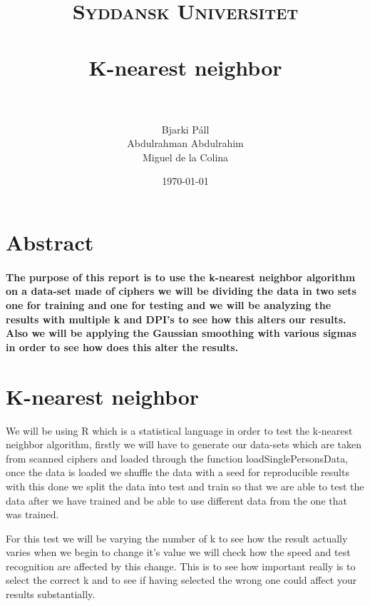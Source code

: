 \documentclass[paper=a4, fontsize=11pt]{scrartcl} %
\title{	
\normalfont \normalsize 
\textsc{Syddansk Universitet} \\ [25pt] 
\horrule{0.5pt} \\[0.4cm] %
\huge K-nearest neighbor \\ %
\horrule{2pt} \\[0.5cm] %
}
\author{Bjarki Páll \\ Abdulrahman Abdulrahim \\ Miguel de la Colina}
\date{\normalsize\today} %
\numberwithin{equation}{section} %
\numberwithin{figure}{section} %
\numberwithin{table}{section} %
\begin{document}
\maketitle %



\section*{Abstract}

\paragraph{The purpose of this report is to use the k-nearest neighbor algorithm on a data-set made of ciphers we will be dividing the data in two sets one for training and one for testing and we will be analyzing the results with multiple k and DPI's to see how this alters our results. Also we will be applying the  Gaussian smoothing with various sigmas in order to see how does this alter the results.}  




\section{K-nearest neighbor}
\begin{flushleft}
We will be using R which is a statistical language in order to test the k-nearest neighbor algorithm, firstly we will have to generate our data-sets which are taken from scanned ciphers and loaded through the function loadSinglePersonsData, once the data is loaded we shuffle the data with a seed for reproducible results with this done we split the data into test and train so that we are able to test the data after we have trained and be able to use different data from the one that was trained.
\end{flushleft}

\begin{flushleft}
For this test we will be varying the number of k to see how the result actually varies when we begin to change it's value we will check how the speed and test recognition are affected by this change. This is to see how important really is to select the correct k and to see if having selected the wrong one could affect your results substantially.
\end{flushleft}
\end{document}

